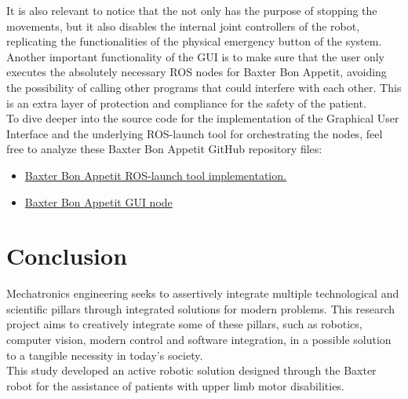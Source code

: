\documentclass[11pt]{report} %
\begin{document}
It is also relevant to notice that the  not only has the purpose of stopping the movements, but it also disables the internal joint controllers of the robot, replicating the functionalities of the physical emergency button of the system.\\

Another important functionality of the GUI is to make sure that the user only executes the absolutely necessary ROS nodes for Baxter Bon Appetit, avoiding the possibility of calling other programs that could interfere with each other. This is an extra layer of protection and compliance for the safety of the patient.\\

To dive deeper into the source code for the implementation of the Graphical User Interface and the underlying ROS-launch tool for orchestrating the nodes, feel free to analyze these Baxter Bon Appetit GitHub repository files:

\begin{itemize}
    \color{blue}
    \item \href{https://github.com/san99tiago/baxter-bon-appetit/blob/main/python/baxter_bon_appetit/launch/mpc_position_control_nodes.launch}{Baxter Bon Appetit ROS-launch tool implementation.}
    
    \item \href{https://github.com/san99tiago/baxter-bon-appetit/blob/main/python/baxter_bon_appetit/scripts/node_gui.py}{Baxter Bon Appetit GUI node
    }
\end{itemize}



\chapter{Conclusion}

Mechatronics engineering seeks to assertively integrate multiple technological and scientific pillars through integrated solutions for modern problems. This research project aims to creatively integrate some of these pillars, such as robotics, computer vision, modern control and software integration, in a possible solution to a tangible necessity in today's society.\\

This study developed an active robotic solution designed through the Baxter robot for the assistance of patients with upper limb motor disabilities.\\
\end{document}
